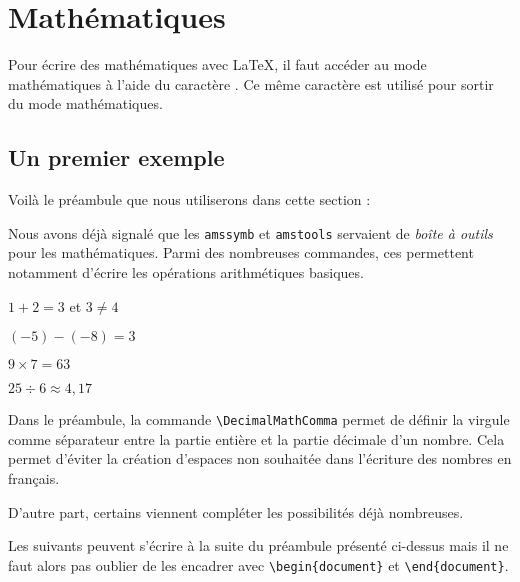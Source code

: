 
\chapter{Mathématiques}

\begin{info}
    Pour écrire des mathématiques avec \LaTeX, il faut accéder au mode \og mathématiques\fg{} à l'aide du caractère \ordi{\$}. Ce même caractère est utilisé pour sortir du mode \og mathématiques\fg{}.
\end{info}

\section{Un premier exemple}

Voilà le préambule que nous utiliserons dans cette section :


Nous avons déjà signalé que les  \texttt{amssymb} et \texttt{amstools} servaient de \og \textit{boîte à outils} \fg{} pour les mathématiques. Parmi des nombreuses commandes, ces  permettent notamment d'écrire les opérations arithmétiques basiques.\bigskip

{
\begin{SideBySideExample}
    $1 + 2 = 3$ et $3 \neq 4$\par
    $(-5) - (-8) = 3$ \par
    $9 \times 7 = 63$\par
    $25 \div 6 \approx 4,17$
\end{SideBySideExample}
}\bigskip

\begin{info}
    Dans le préambule, la commande \texttt{\textbackslash DecimalMathComma} permet de définir la virgule comme séparateur entre la partie entière et la partie décimale d'un nombre. Cela permet d'éviter la création d'espaces non souhaitée dans l'écriture des nombres en français.
\end{info}

D'autre part, certains  viennent compléter les possibilités déjà nombreuses.

\begin{info}
    Les  suivants peuvent s'écrire à la suite du préambule présenté ci-dessus mais il ne faut alors pas oublier de les encadrer avec \texttt{\textbackslash begin\{document\}} et \texttt{\textbackslash end\{document\}}.
\end{info}

